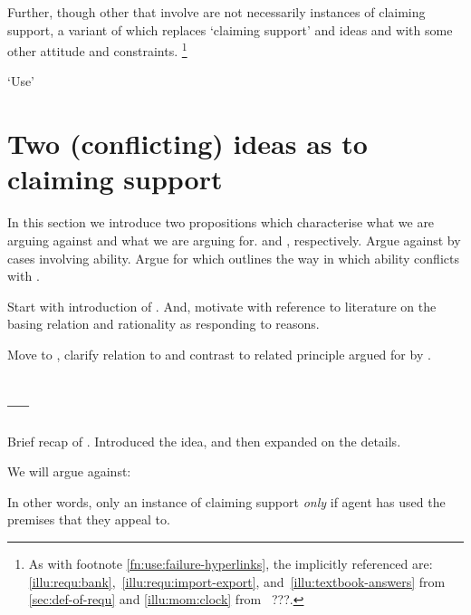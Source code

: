 \begin{note}
  Further, though other  that involve are not necessarily instances of claiming support, a variant of \USE{} which replaces `claiming support' and ideas \ideaCSA{} and \ideaCSB{} with some other attitude and constraints.\nolinebreak
  \footnote{
    As with footnote \ref{fn:use:failure-hyperlinks}, the  implicitly referenced are: \ref{illu:requ:bank},~\ref{illu:requ:import-export}, and~\ref{illu:textbook-answers} from \autoref{sec:def-of-requ} and \ref{illu:mom:clock} from~{\color{red} ???}.
  }
\end{note}

\begin{note}[`Use']
  `Use'
\end{note}

\section{Two (conflicting) ideas as to claiming support}
\label{sec:inter-with-claim}

\begin{note}
  In this section we introduce two propositions which characterise what we are arguing against and what we are arguing for.
   and , respectively.
  Argue against \ESU{} by cases involving ability.
  Argue for \EAS{} which outlines the way in which ability conflicts with \ESU{}.

  Start with introduction of \ESU{}.
  And, motivate with reference to literature on the basing relation and rationality as responding to reasons.

  Move to \EAS{}, clarify relation to \ESU{} and contrast to related principle argued for by \citeauthor{Moretti:2019wx}.
\end{note}

\subsection{ --- \ESU{}}
\label{sec:esu}

\begin{note}
  Brief recap of \USE{}.
  Introduced the idea, and then expanded on the details.
\end{note}

\begin{note}[Focus]
  We will argue against:

  \targetESU*

  In other words, only an instance of claiming support \emph{only} if agent has used the premises that they appeal to.
\end{note}

